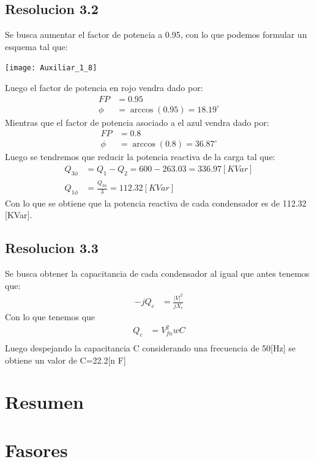 \documentclass[
  11pt,
  letterpaper,
   addpoints,
   answers
  ]{exam}
\begin{document}
\begin{questions}
\begin{solution}
\subsection*{Resolucion 3.2}
Se busca aumentar el factor de potencia a 0.95, con lo que podemos formular un esquema tal que:
\begin{center}
    \texttt{[image: Auxiliar\_1\_8]}
  \end{center}
Luego el factor de potencia en rojo vendra dado por:
\begin{align}
    FP&= 0.95\\
    \phi &= \arccos(0.95) = 18.19^{\circ}
\end{align}
Mientras que el factor de potencia asociado a el azul vendra dado por:
\begin{align}
    FP &= 0.8 \\
    \phi &= \arccos(0.8) = 36.87^\circ
\end{align}
Luego se tendremos que reducir la potencia reactiva de la carga tal que:
\begin{align}
    Q_{3\phi} &= Q_{1} - Q_{2} = 600 - 263.03 = 336.97 [KVar]\\
    Q_{1\phi} &= \frac{Q_{3\phi}}{3} = 112.32 [KVar]
\end{align}
Con lo que se obtiene que la potencia reactiva de cada condensador es de 112.32 [KVar].
\subsection*{Resolucion 3.3}
Se busca obtener la capacitancia de cada condensador al igual que antes tenemos que:
\begin{align}
    -jQ_{c} &= \frac{|V|^{2}}{jX_{c}}
\end{align}
Con lo que tenemos que 
\begin{align}
    Q_{c} &= V_{fn}^{2}wC\\
\end{align}
Luego despejando la capacitancia C considerando una frecuencia de 50[Hz] se obtiene un valor de C=22.2[n F]
\end{solution}

\end{questions}
\newpage
\section{Resumen}

\section*{Fasores}
\end{document}
